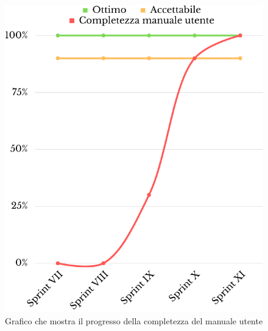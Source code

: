 \begin{figure}[H]
	\centering
	\includegraphics[scale=0.35]{img/manuale.png}
	\caption{Grafico che mostra il progresso della completezza del manuale utente}
\end{figure}
